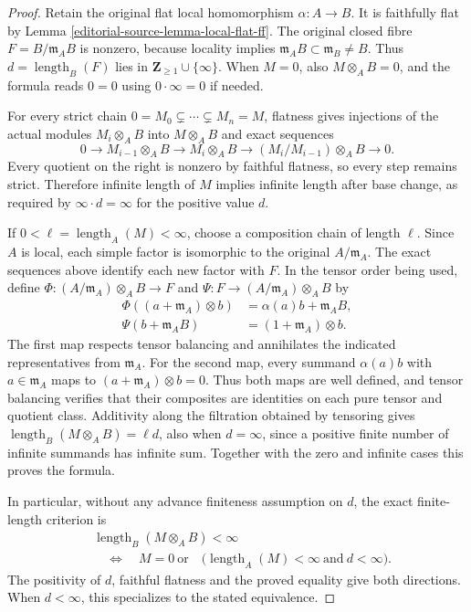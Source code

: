 \begin{proof}
Retain the original flat local homomorphism $\alpha:A\to B$.
It is faithfully flat by Lemma \ref{editorial-source-lemma-local-flat-ff}.
The original closed fibre
$F=B/\mathfrak m_AB$ is nonzero, because locality implies
$\mathfrak m_AB\subset\mathfrak m_B\neq B$.
Thus $d=\operatorname{length}_B(F)$ lies in
$\mathbf Z_{\geq1}\cup\{\infty\}$.
When $M=0$, also $M\otimes_A B=0$, and the formula reads
$0=0$ using $0\cdot\infty=0$ if needed.

For every strict chain $0=M_0\subsetneq\cdots\subsetneq M_n=M$,
flatness gives injections of the actual modules $M_i\otimes_A B$
into $M\otimes_A B$ and exact sequences
$$
0\longrightarrow M_{i-1}\otimes_A B
\longrightarrow M_i\otimes_A B
\longrightarrow (M_i/M_{i-1})\otimes_A B
\longrightarrow0.
$$
Every quotient on the right is nonzero by faithful flatness,
so every step remains strict. Therefore infinite length of $M$
implies infinite length after base change, as required by
$\infty\cdot d=\infty$ for the positive value $d$.

If $0<\ell=\operatorname{length}_A(M)<\infty$, choose a
composition chain of length $\ell$. Since $A$ is local, each
simple factor is isomorphic to the original $A/\mathfrak m_A$.
The exact sequences above identify each new factor with $F$.
In the tensor order being used, define
$\Phi:(A/\mathfrak m_A)\otimes_A B\to F$ and
$\Psi:F\to(A/\mathfrak m_A)\otimes_A B$ by
$$
\begin{aligned}
\Phi((a+\mathfrak m_A)\otimes b)&=\alpha(a)b+\mathfrak m_AB,\\
\Psi(b+\mathfrak m_AB)&=(1+\mathfrak m_A)\otimes b.
\end{aligned}
$$
The first map respects tensor balancing and annihilates the
indicated representatives from $\mathfrak m_A$.
For the second map, every summand $\alpha(a)b$ with
$a\in\mathfrak m_A$ maps to
$(a+\mathfrak m_A)\otimes b=0$. Thus both maps are well
defined, and tensor balancing verifies that their composites
are identities on each pure tensor and quotient class.
Additivity along the filtration obtained by tensoring gives
$\operatorname{length}_B(M\otimes_A B)=\ell d$,
also when $d=\infty$, since a positive finite number of
infinite summands has infinite sum.
Together with the zero and infinite cases this proves the formula.

In particular, without any advance finiteness assumption on $d$,
the exact finite-length criterion is
$$
\begin{aligned}
&\operatorname{length}_B(M\otimes_A B)<\infty\\
&\quad\Longleftrightarrow\quad
M=0\ \text{or}\quad
\bigl(\operatorname{length}_A(M)<\infty\ \text{and}\ d<\infty\bigr).
\end{aligned}
$$
The positivity of $d$, faithful flatness and the proved equality
give both directions. When $d<\infty$, this specializes to
the stated equivalence.
\end{proof}


